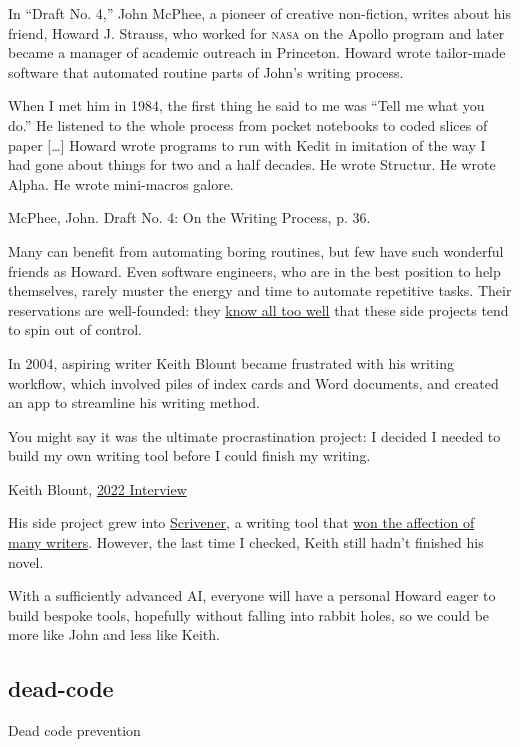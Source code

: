 \documentclass{article}
\begin{document}
In ``Draft No. 4,'' John McPhee, a pioneer of creative non-fiction, writes about his friend,
Howard J. Strauss, who worked for \textsc{nasa} on the Apollo program and later became a manager of academic outreach in Princeton.
Howard wrote tailor-made software that automated routine parts of John's writing process.

\epigraph{
  When I met him in 1984, the first thing he said to me was ``Tell me what you do.''
  He listened to the whole process from pocket notebooks to coded slices of paper [\ldots]
  Howard wrote programs to run with Kedit in imitation of the way I had gone about things for two and a half decades.
  He wrote Structur. He wrote Alpha. He wrote mini-macros galore.
}{McPhee, John. Draft No. 4: On the Writing Process, p. 36.}

Many can benefit from automating boring routines, but few have such wonderful friends as Howard.
Even software engineers, who are in the best position to help themselves, rarely muster the energy and time to automate repetitive tasks.
Their reservations are well-founded: they \href{https://xkcd.com/1319/}{know all too well} that these side projects tend to spin out of control.

In 2004, aspiring writer Keith Blount became frustrated with his writing workflow,
which involved piles of index cards and Word documents,
and created an app to streamline his writing method.

\epigraph{
You might say it was the ultimate procrastination project: I decided I needed to build my own writing tool before I could finish my writing.
}{Keith Blount, \href{https://syntopikon.substack.com/p/an-interview-with-keith-blount}{2022 Interview}}

His side project grew into \href{https://www.literatureandlatte.com/scrivener/overview}{Scrivener},
a writing tool that \href{https://podcast.scrivenerapp.com/}{won the affection of many writers}.
However, the last time I checked, Keith still hadn't finished his novel.

With a sufficiently advanced AI, everyone will have a personal Howard eager to build bespoke tools,
hopefully without falling into rabbit holes, so we could be more like John and less like Keith.

\subsection{dead-code}{Dead code prevention}
\end{document}
